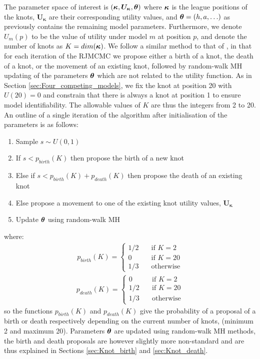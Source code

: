 The parameter space of interest is \((\boldsymbol{\kappa}, \boldsymbol{U_\kappa}, \boldsymbol{\theta})\) where \(\boldsymbol{\kappa}\) is the
league positions of the knots, \(\boldsymbol{U_\kappa}\) are their corresponding utility values, and \(\boldsymbol{\theta} = (h,
a, \ldots)\) as previously contains the remaining model parameters. Furthermore, we denote \(U_m(p)\) to be the value of
utility under model \(m\) at position \(p\), and denote the number of knots as \(K = dim(\boldsymbol{\kappa})\). We follow a
similar method to that of \cite{punska1999}, in that for each iteration of the \gls{RJMCMC} we propose either a birth of
a knot, the death of a knot, or the movement of an existing knot, followed by random-walk \gls{MH} updating of the
parameters \(\boldsymbol{\theta}\) which are not related to the utility function. As in Section \ref{sec:Four_competing_models},
we fix the knot at position 20 with \(U(20) = 0\) and constrain that there is always a knot at position 1 to ensure
model identifiability. The allowable values of \(K\) are thus the integers from 2 to 20. An outline of a single
iteration of the algorithm after initialisation of the parameters is as follows:
\begin{enumerate}
  \item Sample \(s \sim U(0, 1)\)
  \item If \(s < p_{birth}(K)\) then propose the birth of a new knot
  \item Else if \(s < p_{birth}(K) + p_{death}(K)\) then propose the death of an existing knot
  \item Else propose a movement to one of the existing knot utility values, \(\boldsymbol{U_\kappa}\)
  \item Update \(\boldsymbol{\theta}\) using random-walk \gls{MH}
\end{enumerate}
where:
\begin{align}
p_{birth}(K) = \left \{
\begin{array}{ll}
1/2 \quad &\text{if \(K = 2\)}\\
0 \quad &\text{if \(K = 20\)}\\
1/3 \quad &\text{otherwise}
\end{array} \right.
\end{align}
%
\begin{align}
p_{death}(K) = \left \{
\begin{array}{ll}
0 \quad &\text{if \(K = 2\)}\\
1/2 \quad &\text{if \(K = 20\)}\\
1/3 \quad &\text{otherwise}
\end{array} \right.
\end{align}
so the functions \(p_{birth}(K)\) and \(p_{death}(K)\) give the probability of a proposal of a  birth or death
respectively depending on the current number of knots, (minimum 2 and maximum 20). Parameters \(\boldsymbol{\theta}\) are updated
using random-walk \gls{MH} methods, the birth and death proposals are however slightly more non-standard and are thus
explained in Sections \ref{sec:Knot_birth} and \ref{sec:Knot_death}.
 
